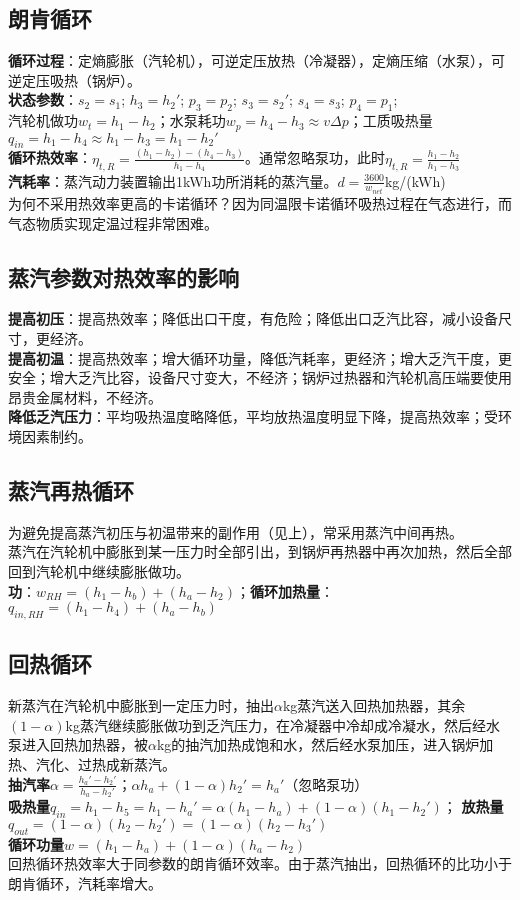 \documentclass[a4paper,9pt]{ctexart}
\begin{document}
\subsection{朗肯循环}
\noindent
\textbf{循环过程}：定熵膨胀（汽轮机），可逆定压放热（冷凝器），定熵压缩（水泵），可逆定压吸热（锅炉）。\\
\textbf{状态参数}：$s_2=s_1$; $h_3=h_2'$; $p_3=p_2$; $s_3=s_2'$; $s_4=s_3$; $p_4=p_1$; \\
汽轮机做功$w_t=h_1-h_2$；水泵耗功$w_p=h_4-h_3\approx v\Delta p$；工质吸热量$q_{in}=h_1-h_4\approx h_1-h_3=h_1-h_2'$\\
\textbf{循环热效率}：$\eta_{t,R}=\frac{(h_1-h_2)-(h_4-h_3)}{h_1-h_4}$。通常忽略泵功，此时$\eta_{t,R}=\frac{h_1-h_2}{h_1-h_3}$\\
\textbf{汽耗率}：蒸汽动力装置输出1kWh功所消耗的蒸汽量。$d=\frac{3600}{w_{net}}$kg/(kWh)\\
为何不采用热效率更高的卡诺循环？因为同温限卡诺循环吸热过程在气态进行，而气态物质实现定温过程非常困难。
\subsection{蒸汽参数对热效率的影响}
\noindent
\textbf{提高初压}：提高热效率；降低出口干度，有危险；降低出口乏汽比容，减小设备尺寸，更经济。\\
\textbf{提高初温}：提高热效率；增大循环功量，降低汽耗率，更经济；增大乏汽干度，更安全；增大乏汽比容，设备尺寸变大，不经济；锅炉过热器和汽轮机高压端要使用昂贵金属材料，不经济。\\
\textbf{降低乏汽压力}：平均吸热温度略降低，平均放热温度明显下降，提高热效率；受环境因素制约。

\subsection{蒸汽再热循环}
\noindent
为避免提高蒸汽初压与初温带来的副作用（见上），常采用蒸汽中间再热。\\
蒸汽在汽轮机中膨胀到某一压力时全部引出，到锅炉再热器中再次加热，然后全部回到汽轮机中继续膨胀做功。\\
\textbf{功}：$w_{RH}=(h_1-h_b)+(h_a-h_2)$；\textbf{循环加热量}：$q_{in,RH}=(h_1-h_4)+(h_a-h_b)$

\subsection{回热循环}
\noindent
新蒸汽在汽轮机中膨胀到一定压力时，抽出$\alpha$kg蒸汽送入回热加热器，其余$(1-\alpha)$kg蒸汽继续膨胀做功到乏汽压力，在冷凝器中冷却成冷凝水，然后经水泵进入回热加热器，被$\alpha$kg的抽汽加热成饱和水，然后经水泵加压，进入锅炉加热、汽化、过热成新蒸汽。\\
\textbf{抽汽率}$\alpha=\frac{h_a'-h_2'}{h_a-h_2'}$；$\alpha h_a+(1-\alpha)h_2'=h_a'$（忽略泵功）\\
\textbf{吸热量}$q_{in}=h_1-h_5=h_1-h_a'=\alpha(h_1-h_a)+(1-\alpha)(h_1-h_2')$；
\textbf{放热量}$q_{out}=(1-\alpha)(h_2-h_2')=(1-\alpha)(h_2-h_3')$\\
\textbf{循环功量}$w=(h_1-h_a)+(1-\alpha)(h_a-h_2)$\\
回热循环热效率大于同参数的朗肯循环效率。由于蒸汽抽出，回热循环的比功小于朗肯循环，汽耗率增大。
\end{document}
